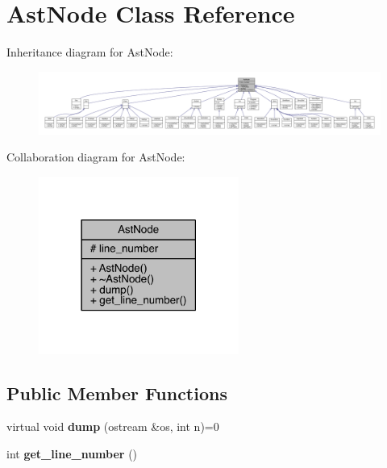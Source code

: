 \hypertarget{class_ast_node}{}\section{Ast\+Node Class Reference}
\label{class_ast_node}


Inheritance diagram for Ast\+Node\+:\nopagebreak
\begin{figure}[H]
\begin{center}
\leavevmode
\includegraphics[width=350pt]{class_ast_node__inherit__graph}
\end{center}
\end{figure}


Collaboration diagram for Ast\+Node\+:\nopagebreak
\begin{figure}[H]
\begin{center}
\leavevmode
\includegraphics[width=186pt]{class_ast_node__coll__graph}
\end{center}
\end{figure}
\subsection*{Public Member Functions}
\begin{DoxyCompactItemize}
\item 
\mbox{\label{class_ast_node_acb1f1b19c076112a17ee276fd2399356}} 
virtual void {\bfseries dump} (ostream \&os, int n)=0
\item 
\mbox{\label{class_ast_node_abc0b47bcba650718684d4277cfae3d9f}} 
int {\bfseries get\+\_\+line\+\_\+number} ()
\end{DoxyCompactItemize}
